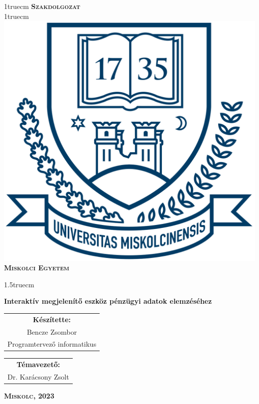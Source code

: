 \pagestyle{empty} %

{\large
\begin{center}
\vglue 1truecm
\textbf{\huge\textsc{Szakdolgozat}}\\
\vglue 1truecm
\includegraphics[width=4.8truecm, height=4truecm]{images/me_logo.png}\\
\textbf{\textsc{Miskolci Egyetem}}
\end{center}}

\vglue 1.5truecm %

{\LARGE
\begin{center}
\textbf{Interaktív megjelenítő eszköz pénzügyi adatok elemzéséhez}
\end{center}}

\vspace*{2.5truecm}
{\large
\begin{center}
\begin{tabular}{c}
\textbf{Készítette:}\\
Bencze Zsombor\\
Programtervező informatikus
\end{tabular}
\end{center}
\begin{center}
\begin{tabular}{c}
\textbf{Témavezető:}\\
Dr. Karácsony Zsolt
\end{tabular}
\end{center}}
\vfill
{\large
\begin{center}
\textbf{\textsc{Miskolc, 2023}}
\end{center}}

\newpage
